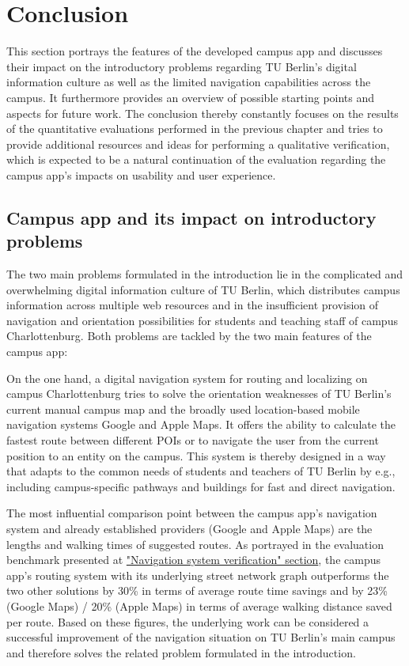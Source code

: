 \chapter{Conclusion}
\label{cha:conclusion}

This section portrays the features of the developed campus app and discusses their impact on the introductory problems regarding TU Berlin's digital information culture as well as the limited navigation capabilities across the campus. It furthermore provides an overview of possible starting points and aspects for future work. The conclusion thereby constantly focuses on the results of the quantitative evaluations performed in the previous chapter and tries to provide additional resources and ideas for performing a qualitative verification, which is expected to be a natural continuation of the evaluation regarding the campus app's impacts on usability and user experience.

\section{Campus app and its impact on introductory problems}
The two main problems formulated in the introduction lie in the complicated and overwhelming digital information culture of TU Berlin, which distributes campus information across multiple web resources and in the insufficient provision of navigation and orientation possibilities for students and teaching staff of campus Charlottenburg. Both problems are tackled by the two main features of the campus app:

On the one hand, a digital navigation system for routing and localizing on campus Charlottenburg tries to solve the orientation weaknesses of TU Berlin's current manual campus map and the broadly used location-based mobile navigation systems Google and Apple Maps. It offers the ability to calculate the fastest route between different POIs or to navigate the user from the current position to an entity on the campus. This system is thereby designed in a way that adapts to the common needs of students and teachers of TU Berlin by e.g., including campus-specific pathways and buildings for fast and direct navigation.

The most influential comparison point between the campus app's navigation system and already established providers (Google and Apple Maps) are the lengths and walking times of suggested routes. As portrayed in the evaluation benchmark presented at \hyperref[sec:navigation_system_verification]{"Navigation system verification" section}, the campus app's routing system with its underlying street network graph outperforms the two other solutions by 30\% in terms of average route time savings and by 23\% (Google Maps) / 20\% (Apple Maps) in terms of average walking distance saved per route. Based on these figures, the underlying work can be considered a successful improvement of the navigation situation on TU Berlin's main campus and therefore solves the related problem formulated in the introduction.

